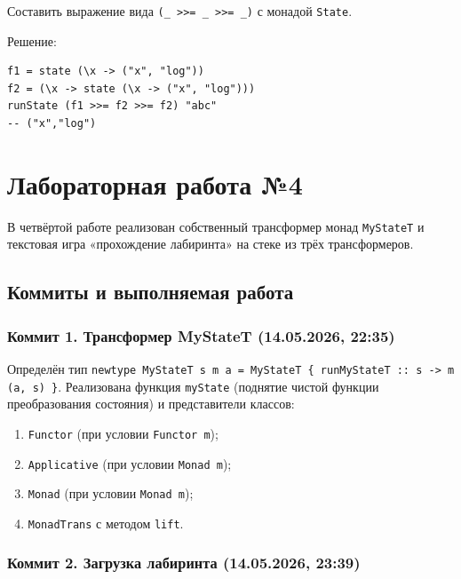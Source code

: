 \documentclass[a4paper, final]{article}
\newenvironment{code}{\captionsetup{type=listing}}{}
\begin{document}
Составить выражение вида \texttt{(\_ >>=\ \_ >>=\ \_)} с монадой \texttt{State}.

Решение:

\begin{code}
\begin{verbatim}
f1 = state (\x -> ("x", "log"))
f2 = (\x -> state (\x -> ("x", "log")))
runState (f1 >>= f2 >>= f2) "abc"
-- ("x","log")
\end{verbatim}
\caption*{Листинг 5: Цепочка >>= для монады State}
\end{code}


\section{Лабораторная работа №4}

В четвёртой работе реализован собственный трансформер монад \texttt{MyStateT}
и текстовая игра «прохождение лабиринта» на стеке из трёх трансформеров.

\subsection{Коммиты и выполняемая работа}

\subsubsection{Коммит 1. Трансформер MyStateT (14.05.2026, 22:35)}

Определён тип
\texttt{newtype MyStateT s m a = MyStateT \{ runMyStateT :: s -> m (a, s) \}}.
Реализована функция \texttt{myState} (поднятие чистой функции преобразования
состояния) и представители классов:
\begin{enumerate}[label=\alph*),leftmargin=*]
  \item \texttt{Functor} (при условии \texttt{Functor m});
  \item \texttt{Applicative} (при условии \texttt{Monad m});
  \item \texttt{Monad} (при условии \texttt{Monad m});
  \item \texttt{MonadTrans} с методом \texttt{lift}.
\end{enumerate}

\subsubsection{Коммит 2. Загрузка лабиринта (14.05.2026, 23:39)}
\end{document}
